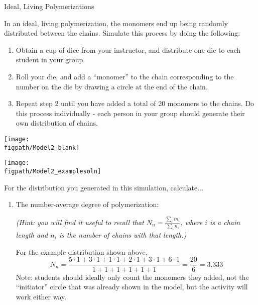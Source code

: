 \begin{activity}{Ideal, Living Polymerizations}
\begin{model}
		In an ideal, living polymerization, the monomers end up being randomly distributed between the chains.  Simulate this process by doing the following:
		\begin{enumerate}
			\item Obtain a cup of dice from your instructor, and distribute one die to each student in your group.
			\item Roll your die, and add a ``monomer'' to the chain corresponding to the number on the die by drawing a circle at the end of the chain.
			\item Repeat step 2 until you have added a total of 20 monomers to the chains.  Do this process individually - each person in your group should generate their own distribution of chains.
		\end{enumerate}
		
		\vspace{-18pt}
		\begin{solution}[2.5in]{\centerline{\texttt{[image: \\figpath/Model2\_blank]}}}\centerline{\texttt{[image: \\figpath/Model2\_examplesoln]}}\end{solution} %
	
\end{model}

\begin{ctqs}
	
	\question For the distribution you generated in this simulation, calculate... \label{\labelbase:ctq:simulationcalcs}
	
		\begin{enumerate}
			\item The number-average degree of polymerization:
			
				\emph{(Hint: you will find it useful to recall that $N_n = \frac{\sum_i i n_i}{\sum_i n_i}$, where $i$ is a chain length and $n_i$ is the number of chains with that length.)}
			
				\begin{solution}[2in]{}
					For the example distribution shown above,
					\begin{equation*}
						N_n = \frac{5\cdot 1 + 3\cdot 1 + 1\cdot 1 + 2\cdot 1 + 3\cdot 1 + 6\cdot 1}{1+1+1+1+1+1} = \frac{20}{6}=3.333
					\end{equation*}
					Note: students should ideally only count the monomers they added, not the ``initiator'' circle that was already shown in the model, but the activity will work either way.
				\end{solution}
			

\end{enumerate}
\end{ctqs}
\end{activity}
